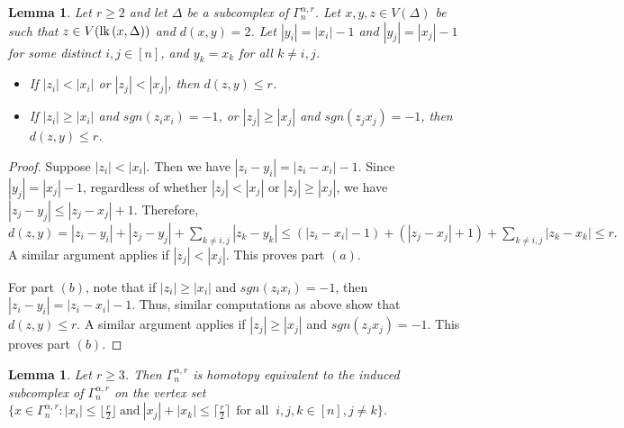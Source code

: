 \documentclass{amsart}
\newtheorem{lemma}[theorem]{Lemma}
\theoremstyle{definition}
\theoremstyle{remark}
\numberwithin{equation}{section}
\newcommand{\lk}{\mbox{\upshape lk}\,}
\newcommand{\D}{\Delta}
\newcommand{\f}{\lfloor\frac{r}{2}\rfloor}
\newcommand{\cil}{\lceil\frac{r}{2}\rceil}
\begin{document}
\begin{lemma}\label{twovertex}
	Let $r\geq 2$ and let  $\D$ be  a subcomplex of $\Gamma_n^{\alpha, r}$. Let $x,y,z\in V(\D)$ be  such that $z\in V(\lk(x,\D))$ and $d(x,y)=2$. Let $|y_i|=|x_i|-1$ and $|y_j|=|x_j|-1$ for some  distinct $i,j \in [n]$,  and $y_k=x_k$ for all $k\neq i,j$.  
	\begin{itemize}
		\item[(a)] If $|z_i|<|x_i|$ or $|z_j|<|x_j|$,  then $d(z,y)\leq r$. 
		\item[(b)] If  $|z_i|\geq |x_i|$ and $sgn(z_ix_i)=-1$, or  $|z_j|\geq |x_j|$ and $sgn(z_jx_j)=-1$,  then $d(z,y)\leq  r$.
		
	\end{itemize}
\end{lemma}



\begin{proof}
	Suppose $|z_i| < |x_i|$. Then we have $|z_i - y_i| = |z_i - x_i| - 1$. Since $|y_j|=|x_j|-1$, regardless of whether $|z_j| < |x_j|$ or $|z_j| \geq |x_j|$, we have $|z_j - y_j| \leq |z_j - x_j| + 1$. Therefore,
	$d(z, y) = |z_i - y_i| + |z_j - y_j| + \sum_{k \neq i, j} |z_k - y_k| \leq (|z_i - x_i| - 1) + (|z_j - x_j| + 1) + \sum_{k \neq i, j} |z_k - x_k| \leq r.$
	A similar argument applies if $|z_j| < |x_j|$. This proves part $(a)$.
	
	
	For part $(b)$, note that if $|z_i| \geq |x_i|$ and $sgn(z_i x_i) = -1$, then $|z_i - y_i| = |z_i - x_i| - 1$. Thus, similar computations as above show that $d(z, y) \leq r$. A similar argument applies if $|z_j| \geq |x_j|$ and $sgn(z_j x_j) = -1$. This proves part $(b)$.
\end{proof}



\begin{lemma}\label{xi+xj}
	Let $r \geq 3$. Then $\Gamma_n^{\alpha, r}$ is homotopy equivalent to the induced subcomplex of $\Gamma_n^{\alpha, r}$ on the vertex set $\{x \in \Gamma_n^{\alpha, r} : |x_i| \leq \f \ \text{and} \ |x_j| + |x_k| \leq \cil \ \ \text{for all } \ i,j,k\in [n], j\neq k\}$.
	
\end{lemma}
\end{document}
